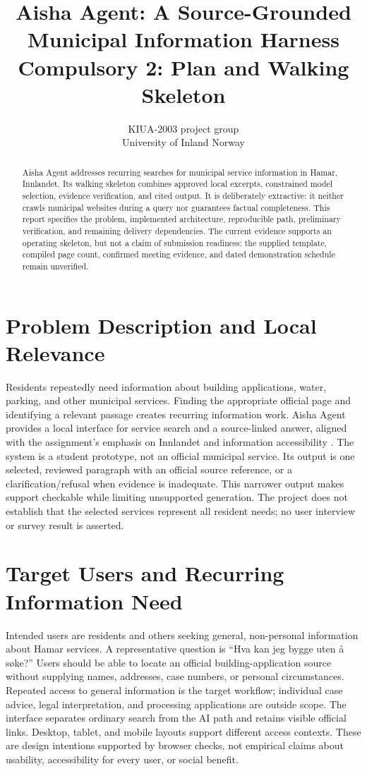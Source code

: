 \documentclass{article}
\title{Aisha Agent: A Source-Grounded Municipal Information Harness\\Compulsory 2: Plan and Walking Skeleton}
\author{KIUA-2003 project group\\University of Inland Norway}
\begin{document}
\maketitle
\begin{abstract}
Aisha Agent addresses recurring searches for municipal service information in Hamar, Innlandet. Its walking skeleton combines approved local excerpts, constrained model selection, evidence verification, and cited output. It is deliberately extractive: it neither crawls municipal websites during a query nor guarantees factual completeness. This report specifies the problem, implemented architecture, reproducible path, preliminary verification, and remaining delivery dependencies. The current evidence supports an operating skeleton, but not a claim of submission readiness: the supplied template, compiled page count, confirmed meeting evidence, and dated demonstration schedule remain unverified.
\end{abstract}

\section{Problem Description and Local Relevance}
Residents repeatedly need information about building applications, water, parking, and other municipal services. Finding the appropriate official page and identifying a relevant passage creates recurring information work. Aisha Agent provides a local interface for service search and a source-linked answer, aligned with the assignment's emphasis on Innlandet and information accessibility \cite{assignment}. The system is a student prototype, not an official municipal service. Its output is one selected, reviewed paragraph with an official source reference, or a clarification/refusal when evidence is inadequate. This narrower output makes support checkable while limiting unsupported generation. The project does not establish that the selected services represent all resident needs; no user interview or survey result is asserted.

\section{Target Users and Recurring Information Need}
Intended users are residents and others seeking general, non-personal information about Hamar services. A representative question is ``Hva kan jeg bygge uten å søke?'' Users should be able to locate an official building-application source without supplying names, addresses, case numbers, or personal circumstances. Repeated access to general information is the target workflow; individual case advice, legal interpretation, and processing applications are outside scope. The interface separates ordinary search from the AI path and retains visible official links. Desktop, tablet, and mobile layouts support different access contexts. These are design intentions supported by browser checks, not empirical claims about usability, accessibility for every user, or social benefit.
\end{document}
